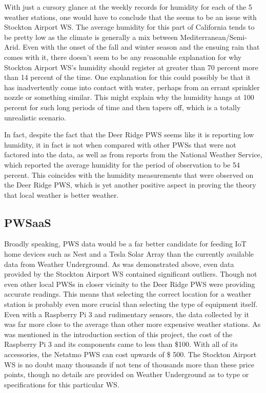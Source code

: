 \documentclass[sigconf]{acmart}
\begin{document}
With just a cursory glance at the weekly records for humidity for each of the 5 weather stations, one would have to conclude that the seems to be an issue with Stockton Airport WS. The average humidity for this part of California tends to be pretty low as the climate is generally a mix between Mediterranean/Semi-Arid. Even with the onset of the fall and winter season and the ensuing rain that comes with it, there doesn't seem to be any reasonable explanation for why Stockton Airport WS's humidity should register at greater than 70 percent more than 14 percent of the time. One explanation for this could possibly be that it has inadvertently come into contact with water, perhaps from an errant sprinkler nozzle or something similar. This might explain why the humidity hangs at 100 percent for such long periods of time and then tapers off, which is a totally unrealistic scenario. 

In fact, despite the fact that the Deer Ridge PWS seems like it is reporting low humidity, it in fact is not when compared with other PWSs that were not factored into the data, as well as from reports from the National Weather Service\cite{NWS2017}, which reported the average humidity for the period of observation to be 54 percent. This coincides with the humidity measurements that were observed on the Deer Ridge PWS, which is yet another positive aspect in proving the theory that local weather is better weather.

\subsection{PWSaaS}

Broadly speaking, PWS data would be a far better candidate for feeding IoT home devices such as Nest and a Tesla Solar Array than the currently available data from Weather Underground. As was demonstrated above, even data provided by the Stockton Airport WS contained significant outliers. Though not even other local PWSs in closer vicinity to the Deer Ridge PWS were providing accurate readings. This means that selecting the correct location for a weather station is probably even more crucial than selecting the type of equipment itself. Even with a Raspberry Pi 3 and rudimentary sensors, the data collected by it was far more close to the average than other more expensive weather stations. As was mentioned in the introduction section of this project, the cost of the Raspberry Pi 3 and its components came to less than \$100. With all of its accessories, the Netatmo PWS can cost upwards of \$ 500\cite{Netatmo2017}. The Stockton Airport WS is no doubt many thousands if not tens of thousands more than these price points, though no details are provided on Weather Underground as to type or specifications for this particular WS.
\end{document}
